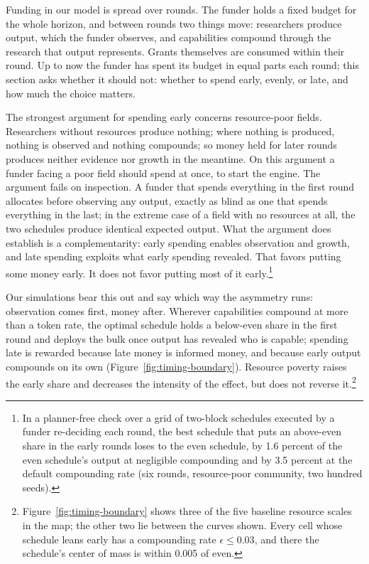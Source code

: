\documentclass[article, 11pt, reqno]{amsart}
\theoremstyle{named}
\begin{document}
Funding in our model is spread over rounds. The funder holds a fixed budget for the
whole horizon, and between rounds two things move: researchers produce output, which
the funder observes, and capabilities compound through the research that output
represents. Grants themselves are consumed within their round. Up to now the funder
has spent its budget in equal parts each round; this section asks whether it should
not: whether to spend early, evenly, or late, and how much the choice matters.

The strongest argument for spending early concerns resource-poor fields. Researchers
without resources produce nothing; where nothing is produced, nothing is observed and
nothing compounds; so money held for later rounds produces neither evidence nor growth in
the meantime. On this argument a funder facing a poor field should spend at once, to
start the engine. The argument fails on inspection. A funder that spends everything in
the first round allocates before observing any output, exactly as blind as one that
spends everything in the last; in the extreme case of a field with no resources at
all, the two schedules produce identical expected output. What the argument does
establish is a complementarity: early spending enables observation and growth, and
late spending exploits what early spending revealed. That favors putting some money
early. It does not favor putting most of it early.\footnote{In a planner-free check
over a grid of two-block schedules executed by a funder re-deciding each round, the
best schedule that puts an above-even share in the early rounds loses to the even
schedule, by 1.6 percent of the even schedule's output at negligible compounding and
by 3.5 percent at the default compounding rate (six rounds, resource-poor community,
two hundred seeds).}

Our simulations bear this out and say which way the asymmetry runs: observation comes
first, money after. Wherever capabilities compound at more than a token rate, the
optimal schedule holds a below-even share in the first round and deploys the bulk once
output has revealed who is capable; spending late is rewarded because late money is
informed money, and because early output compounds on its own
(Figure~\ref{fig:timing-boundary}). Resource poverty raises the early share and
decreases the intensity of the effect, but does not reverse
it.\footnote{Figure~\ref{fig:timing-boundary} shows three of the five baseline
resource scales in the map; the other two lie between the curves shown. Every cell
whose schedule leans early has a compounding rate $\epsilon \leq 0.03$, and there the
schedule's center of mass is within 0.005 of even.}
\end{document}
